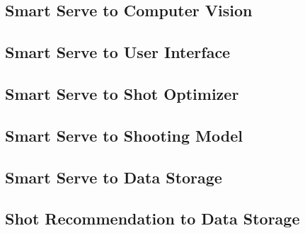 \documentclass[11pt]{article}
\begin{document}
\subsection{Smart Serve to Computer Vision}
\subsection{Smart Serve to User Interface}
\subsection{Smart Serve to Shot Optimizer}
\subsection{Smart Serve to Shooting Model}
\subsection{Smart Serve to Data Storage}
\subsection{Shot Recommendation to Data Storage}
\end{document}
